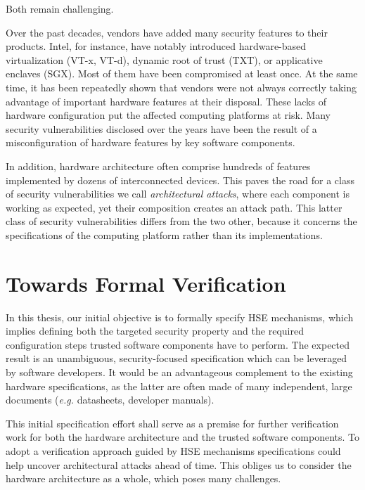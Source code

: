 Both remain challenging.

Over the past decades, vendors have added many security features to their
products.
%
Intel, for instance, have notably introduced hardware-based virtualization
(VT-x, VT-d), dynamic root of trust (TXT), or applicative enclaves (SGX).
%
Most of them have been compromised at least once.
%
At the same time, it has been repeatedly shown that vendors were not always
correctly taking advantage of important hardware features at their disposal.
%
These lacks of hardware configuration put the affected computing platforms at
risk.
%
Many security vulnerabilities disclosed over the years have been the result of a
misconfiguration of hardware features by key software components.

In addition, hardware architecture often comprise hundreds of features
implemented by dozens of interconnected devices.
%
This paves the road for a class of security vulnerabilities we call
\emph{architectural attacks}, where each component is working as expected, yet
their composition creates an attack path.
%
This latter class of security vulnerabilities differs from the two other,
because it concerns the specifications of the computing platform rather than its
implementations.

\section{Towards Formal Verification}

In this thesis, our initial objective is to formally specify HSE mechanisms,
which implies defining both the targeted security property and the required
configuration steps trusted software components have to perform.
%
The expected result is an unambiguous, security-focused specification which can
be leveraged by software developers.
%
It would be an advantageous complement to the existing hardware specifications,
as the latter are often made of many independent, large documents (\emph{e.g.}
datasheets, developer manuals).

This initial specification effort shall serve as a premise for further
verification work for both the hardware architecture and the trusted software
components.
%
To adopt a verification approach guided by HSE mechanisms specifications could
help uncover architectural attacks ahead of time.
%
This obliges us to consider the hardware architecture as a whole, which poses
many challenges.



